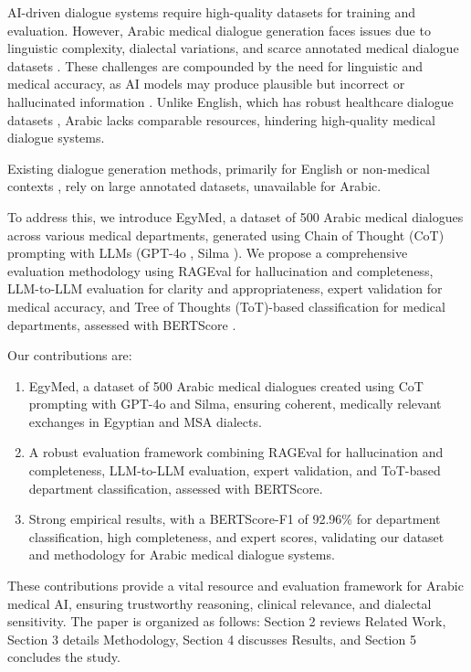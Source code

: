 \documentclass[manuscript,screen,review]{acmart}
\begin{document}
AI-driven dialogue systems require high-quality datasets for training and evaluation. However, Arabic medical dialogue generation faces issues due to linguistic complexity, dialectal variations, and scarce annotated medical dialogue datasets \cite{Abdelhay2023Deep, al2024ahd}. These challenges are compounded by the need for linguistic and medical accuracy, as AI models may produce plausible but incorrect or hallucinated information \cite{daoud2025medarabiqbenchmarkinglargelanguage}. Unlike English, which has robust healthcare dialogue datasets \cite{he2020meddialoglargescalemedicaldialogue, liu2022meddgentitycentricmedicalconsultation}, Arabic lacks comparable resources, hindering high-quality medical dialogue systems.

Existing dialogue generation methods, primarily for English or non-medical contexts \cite{naous2021empatheticbert2bertconversationalmodel, shi2024medicaldialoguesurveycategories}, rely on large annotated datasets, unavailable for Arabic.

To address this, we introduce EgyMed, a dataset of 500 Arabic medical dialogues across various medical departments, generated using Chain of Thought (CoT) prompting with LLMs (GPT-4o \cite{gpt4o2024system}, Silma \cite{silma_01_2024}). We propose a comprehensive evaluation methodology using RAGEval \cite{zhu2024ragevalscenariospecificrag} for hallucination and completeness, LLM-to-LLM evaluation for clarity and appropriateness, expert validation for medical accuracy, and Tree of Thoughts (ToT)-based classification for medical departments, assessed with BERTScore \cite{zhang2020bertscoreevaluatingtextgeneration}.

Our contributions are:
\begin{enumerate}
\item EgyMed, a dataset of 500 Arabic medical dialogues created using CoT prompting with GPT-4o and Silma, ensuring coherent, medically relevant exchanges in Egyptian and MSA dialects.
\item A robust evaluation framework combining RAGEval for hallucination and completeness, LLM-to-LLM evaluation, expert validation, and ToT-based department classification, assessed with BERTScore.
\item Strong empirical results, with a BERTScore-F1 of 92.96\% for department classification, high completeness, and expert scores, validating our dataset and methodology for Arabic medical dialogue systems.
\end{enumerate}

These contributions provide a vital resource and evaluation framework for Arabic medical AI, ensuring trustworthy reasoning, clinical relevance, and dialectal sensitivity. The paper is organized as follows: Section 2 reviews Related Work, Section 3 details Methodology, Section 4 discusses Results, and Section 5 concludes the study.
\end{document}
